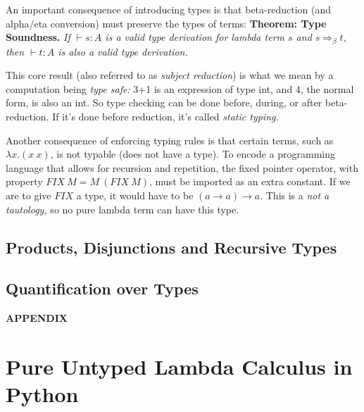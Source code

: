 An important consequence of introducing types is that beta-reduction
(and alpha/eta conversion) must preserve the types of terms:
{\flushleft\bf Theorem: Type Soundness.} {\em If $\vdash s:A$ is a valid type derivation
  for lambda term $s$ and $s\Rightarrow_\beta t$, then $\vdash t:A$ is also a
  valid type derivation.}

  This core result (also referred to as {\em subject reduction\/}) is what we
  mean by a computation being {\em type safe:\/} 
  3+1 is an expression of type int, and 4, the normal form, is also an int.
  So type checking can be done before, during, or after beta-reduction. If
  it's done before reduction, it's called {\em static typing.\/}
  
Another consequence of enforcing typing rules is that certain terms,
such as $\lambda x.(x~x)$, is not typable (does not have a type).  To
encode a programming language that allows for recursion and
repetition, the fixed pointer operator, with property $FIX~M = M~(FIX
~M)$, must be imported as an extra constant.  If we are to give $FIX$
a type, it would have to be $(a\rightarrow a)\rightarrow a$.  This is
a {\em not a tautology,\/} so no pure lambda term can have this type.


\subsection{Products, Disjunctions and Recursive Types}
\subsection{Quantification over Types}

\bigskip

\appendix

    \medskip   
    {\Large {\bf APPENDIX}}
    \medskip   


\section{Pure Untyped Lambda Calculus in Python}

